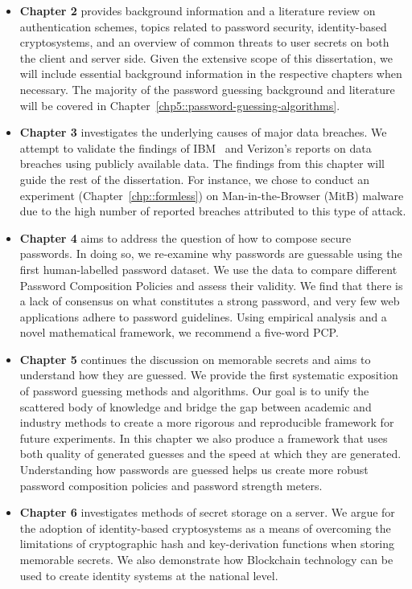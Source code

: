 \begin{itemize}
\item \textbf{Chapter 2} provides background information and a literature review on authentication schemes, topics related to password security, identity-based cryptosystems, and an overview of common threats to user secrets on both the client and server side. Given the extensive scope of this dissertation, we will include essential background information in the respective chapters when necessary. The majority of the password guessing background and literature will be covered in Chapter~\ref{chp5::password-guessing-algorithms}.
\item \textbf{Chapter 3} investigates the underlying causes of major data breaches. We attempt to validate the findings of IBM~\cite{ibm_security_ibm-2020_2020, ibm_ibm-2023_2023} and Verizon's reports on data breaches using publicly available data. The findings from this chapter will guide the rest of the dissertation. For instance, we chose to conduct an experiment (Chapter~\ref{chp::formless}) on Man-in-the-Browser (MitB) malware due to the high number of reported breaches attributed to this type of attack.
\item \textbf{Chapter 4} aims to address the question of how to compose secure passwords. In doing so, we re-examine why passwords are guessable using the first human-labelled password dataset. We use the data to compare different Password Composition Policies and assess their validity. We find that there is a lack of consensus on what constitutes a strong password, and very few web applications adhere to password guidelines. Using empirical analysis and a novel mathematical framework, we recommend a five-word PCP.
\item \textbf{Chapter 5} continues the discussion on memorable secrets and aims to understand how they are guessed. We provide the first systematic exposition of password guessing methods and algorithms. Our goal is to unify the scattered body of knowledge and bridge the gap between academic and industry methods to create a more rigorous and reproducible framework for future experiments. In this chapter we also produce a framework that uses both quality of generated guesses and the speed at which they are generated. Understanding how passwords are guessed helps us create more robust password composition policies and password strength meters.
\item \textbf{Chapter 6} investigates methods of secret storage on a server. We argue for the adoption of identity-based cryptosystems as a means of overcoming the limitations of cryptographic hash and key-derivation functions when storing memorable secrets. We also demonstrate how Blockchain technology can be used to create identity systems at the national level.

\end{itemize}
